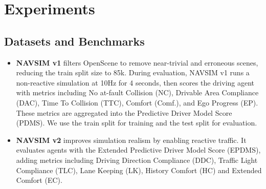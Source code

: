 \section{Experiments}
\label{sec: experiments}


\subsection{Datasets and Benchmarks}
\label{sec: datasets_benchmarks}
\begin{itemize}
    \item \textbf{NAVSIM v1} \cite{navsim-v1} filters OpenScene to remove near-trivial and erroneous scenes, reducing the train split size to 85k. During evaluation, NAVSIM v1 runs a non-reactive simulation at 10Hz for 4 seconds, then scores the driving agent with metrics including No at-fault Collision (NC), Drivable Area Compliance (DAC), Time To Collision (TTC), Comfort (Comf.), and Ego Progress (EP). These metrics are aggregated into the Predictive Driver Model Score (PDMS). We use the train split for training and the test split for evaluation.
    \item \textbf{NAVSIM v2} \cite{navsim-v2} improves simulation realism by enabling reactive traffic. It evaluates agents with the Extended Predictive Driver Model Score (EPDMS), adding metrics including Driving Direction Compliance (DDC), Traffic Light Compliance (TLC), Lane Keeping (LK), History Comfort (HC) and Extended Comfort (EC). 
\end{itemize}








